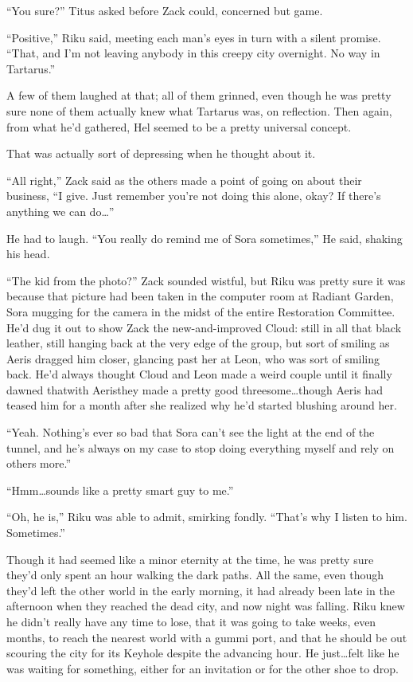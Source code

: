 ``You sure?'' Titus asked before Zack could, concerned but game.

``Positive,'' Riku said, meeting each man's eyes in turn with a silent promise. ``That, and I'm not leaving anybody in this creepy city overnight. No way in Tartarus.''

A few of them laughed at that; all of them grinned, even though he was pretty sure none of them actually knew what Tartarus was, on reflection. Then again, from what he'd gathered, Hel seemed to be a pretty universal concept.

That was actually sort of depressing when he thought about it.

``All right,'' Zack said as the others made a point of going on about their business, ``I give. Just remember you're not doing this alone, okay? If there's anything we can do\ldots''

He had to laugh. ``You really do remind me of Sora sometimes,'' He said, shaking his head.

``The kid from the photo?'' Zack sounded wistful, but Riku was pretty sure it was because that picture had been taken in the computer room at Radiant Garden, Sora mugging for the camera in the midst of the entire Restoration Committee. He'd dug it out to show Zack the new-and-improved Cloud: still in all that black leather, still hanging back at the very edge of the group, but sort of smiling as Aeris dragged him closer, glancing past her at Leon, who was sort of smiling back. He'd always thought Cloud and Leon made a weird couple until it finally dawned that\textemdash with Aeris\textemdash they made a pretty good threesome\ldots though Aeris had teased him for a month after she realized why he'd started blushing around her.

``Yeah. Nothing's ever so bad that Sora can't see the light at the end of the tunnel, and he's always on my case to stop doing everything myself and rely on others more.''

``Hmm\ldots sounds like a pretty smart guy to me.''

``Oh, he is,'' Riku was able to admit, smirking fondly. ``That's why I listen to him. Sometimes.''

Though it had seemed like a minor eternity at the time, he was pretty sure they'd only spent an hour walking the dark paths. All the same, even though they'd left the other world in the early morning, it had already been late in the afternoon when they reached the dead city, and now night was falling. Riku knew he didn't really have any time to lose, that it was going to take weeks, even months, to reach the nearest world with a gummi port, and that he should be out scouring the city for its Keyhole despite the advancing hour. He just\ldots felt like he was waiting for something, either for an invitation or for the other shoe to drop.


